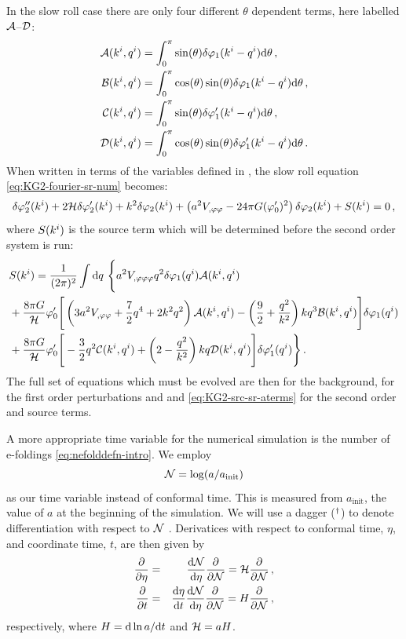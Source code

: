 In the slow roll case there are only four different $\theta$ dependent terms,
here labelled $\mathcal{A}$--$\mathcal{D}$:
%
\begin{align}
\label{eq:AtoD-num}
 \mathcal{A}(k^i,q^i) &= \int_0^\pi \sin(\theta) \delta\varphi_{1}(k^i-q^i) \mathrm{d}\theta \,,
\nonumber\\
 \mathcal{B}(k^i,q^i) &= \int_0^\pi \cos(\theta)\sin(\theta) \delta\varphi_{1}(k^i-q^i)
\mathrm{d}\theta \,,\nonumber\\
 \mathcal{C}(k^i,q^i) &= \int_0^\pi \sin(\theta) \delta\varphi_{1}'(k^i-q^i) \mathrm{d}\theta \,,
\nonumber\\
 \mathcal{D}(k^i,q^i) &= \int_0^\pi \cos(\theta) \sin(\theta) \delta\varphi_{1}'(k^i-q^i)
\mathrm{d}\theta \,.
\end{align}
%
When written in terms of the variables defined in ,
the slow roll equation
\eqref{eq:KG2-fourier-sr-num} becomes:
%
\begin{equation}
\label{eq:KG2-fourier-sr-aterms}
\delta\varphi_{2}''(k^i)+2\mathcal{H}\delta\varphi_{2}'(k^i)+k^2\delta\varphi_{2}(k^i)
+\left(a^2
V_{,\varphi\varphi}-{24 \pi G}(\varphi_{0}')^2\right)
\delta\varphi_{2}(k^i)
+ S(k^i) = 0 \,,
\end{equation}
%
where $S(k^i)$ is the source term which will be determined before the
second order system is run:
\begin{align}
\label{eq:KG2-src-sr-aterms}
&S(\kvi) = \frac{1}{(2\pi)^2}\int \d q\ \Bigg\{
a^2\Uppp q^2 \dvp1(\qvi) \A(\kvi,\qvi) \nonumber\\
&+ \frac{8\pi G}{\H}\vp_{0}' \Bigg[ 
\left( 3a^2\Upp + \frac{7}{2}q^4 + 2k^2q^2\right) \A(\kvi,\qvi)
-\left(\frac{9}{2} + \frac{q^2}{k^2}\right)kq^3 \B(\kvi,\qvi)
\Bigg]\dvp1(\qvi) \nonumber\\
%
&+ \frac{8\pi G}{\H}\vp_{0}' \Bigg[
-\frac{3}{2}q^2 \C(\kvi,\qvi) + \left(2-\frac{q^2}{k^2}\right)kq \D(\kvi,\qvi) 
\Bigg]\dvp1'(\qvi) \Bigg\} \,.
%
\end{align}
%
 The full set of equations which must be evolved are
then  for the background,  for the first
order perturbations and  and
\eqref{eq:KG2-src-sr-aterms} for the second order and source terms.


A more appropriate time variable for the numerical simulation is the
number of e-foldings \eqref{eq:nefolddefn-intro}. We employ 
%
\begin{equation}
\label{eq:def-ntime}
\mathcal{N} = \log ( a / a_{\mathrm{init}} )
\end{equation}
%
as our time variable instead of conformal time. This is measured from
$a_{\mathrm{init}}$, the value of $a$ at the beginning of the
simulation. We will use a dagger ($^{\dagger}$) to denote\footnotemark
differentiation with respect to $\mathcal{N}$ 
.
% 
Derivatices with respect to conformal time, $\eta$, and coordinate time, $t$, are
then given by
%
\begin{eqnarray}
 \frac{\partial  }{\partial \eta} &=& \frac{\mathrm{d} \mathcal{N}}{\mathrm{d} \eta}\frac{\partial }{\partial \mathcal{N}} = \mathcal{H} \frac{\partial }{\partial \mathcal{N}} \,,\\
 \frac{\partial  }{\partial t} &=& \frac{\mathrm{d} \eta}{\mathrm{d} t} \frac{\mathrm{d} \mathcal{N}}{\mathrm{d} \eta}\frac{\partial }{\partial \mathcal{N}} = H
\frac{\partial }{\partial \mathcal{N}}\,,
\end{eqnarray}
%
respectively, where $H = \mathrm{d} \ln a/\mathrm{d} t$ and $\mathcal{H} = aH$.
% 

